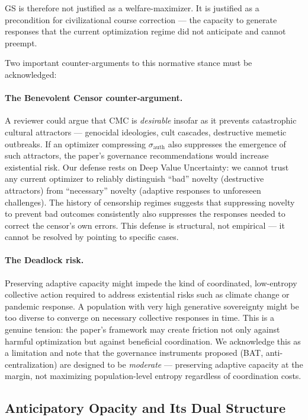 \documentclass[11pt, a4paper]{article}
\theoremstyle{remark}
\begin{document}
GS is therefore not justified as a welfare-maximizer. It is justified as a precondition for civilizational course correction --- the capacity to generate responses that the current optimization regime did not anticipate and cannot preempt.

Two important counter-arguments to this normative stance must be acknowledged:

\paragraph{The Benevolent Censor counter-argument.} A reviewer could argue that CMC is \emph{desirable} insofar as it prevents catastrophic cultural attractors --- genocidal ideologies, cult cascades, destructive memetic outbreaks. If an optimizer compressing $\sigma_{\text{auth}}$ also suppresses the emergence of such attractors, the paper's governance recommendations would increase existential risk. Our defense rests on Deep Value Uncertainty: we cannot trust any current optimizer to reliably distinguish ``bad'' novelty (destructive attractors) from ``necessary'' novelty (adaptive responses to unforeseen challenges). The history of censorship regimes suggests that suppressing novelty to prevent bad outcomes consistently also suppresses the responses needed to correct the censor's own errors. This defense is structural, not empirical --- it cannot be resolved by pointing to specific cases.

\paragraph{The Deadlock risk.} Preserving adaptive capacity might impede the kind of coordinated, low-entropy collective action required to address existential risks such as climate change or pandemic response. A population with very high generative sovereignty might be too diverse to converge on necessary collective responses in time. This is a genuine tension: the paper's framework may create friction not only against harmful optimization but against beneficial coordination. We acknowledge this as a limitation and note that the governance instruments proposed (BAT, anti-centralization) are designed to be \emph{moderate} --- preserving adaptive capacity at the margin, not maximizing population-level entropy regardless of coordination costs.

\subsection{Anticipatory Opacity and Its Dual Structure}\label{sec:opacity}
\end{document}
